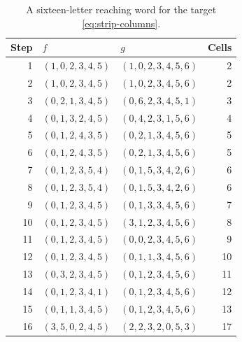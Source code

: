 \documentclass[11pt,letterpaper]{article}
\numberwithin{equation}{section}
\theoremstyle{definition}
\theoremstyle{remark}
\begin{document}
\begin{table}[H]
\centering
\small
\caption{A sixteen-letter reaching word for the target
\eqref{eq:strip-columns}.}
\label{tab:strip-word}
\begin{tabular}{rllr}
\toprule
Step & $f$ & $g$ & Cells\\
\midrule
1 & $(1,0,2,3,4,5)$ & $(1,0,2,3,4,5,6)$ & 2 \\
2 & $(1,0,2,3,4,5)$ & $(1,0,2,3,4,5,6)$ & 2 \\
3 & $(0,2,1,3,4,5)$ & $(0,6,2,3,4,5,1)$ & 3 \\
4 & $(0,1,3,2,4,5)$ & $(0,4,2,3,1,5,6)$ & 4 \\
5 & $(0,1,2,4,3,5)$ & $(0,2,1,3,4,5,6)$ & 5 \\
6 & $(0,1,2,4,3,5)$ & $(0,2,1,3,4,5,6)$ & 5 \\
7 & $(0,1,2,3,5,4)$ & $(0,1,5,3,4,2,6)$ & 6 \\
8 & $(0,1,2,3,5,4)$ & $(0,1,5,3,4,2,6)$ & 6 \\
9 & $(0,1,2,3,4,5)$ & $(0,1,3,3,4,5,6)$ & 7 \\
10 & $(0,1,2,3,4,5)$ & $(3,1,2,3,4,5,6)$ & 8 \\
11 & $(0,1,2,3,4,5)$ & $(0,0,2,3,4,5,6)$ & 9 \\
12 & $(0,1,2,3,4,5)$ & $(0,1,1,3,4,5,6)$ & 10 \\
13 & $(0,3,2,3,4,5)$ & $(0,1,2,3,4,5,6)$ & 11 \\
14 & $(0,1,2,3,4,1)$ & $(0,1,2,3,4,5,6)$ & 12 \\
15 & $(0,1,1,3,4,5)$ & $(0,1,2,3,4,5,6)$ & 13 \\
16 & $(3,5,0,2,4,5)$ & $(2,2,3,2,0,5,3)$ & 17 \\
\bottomrule
\end{tabular}
\end{table}

\clearpage
\end{document}
